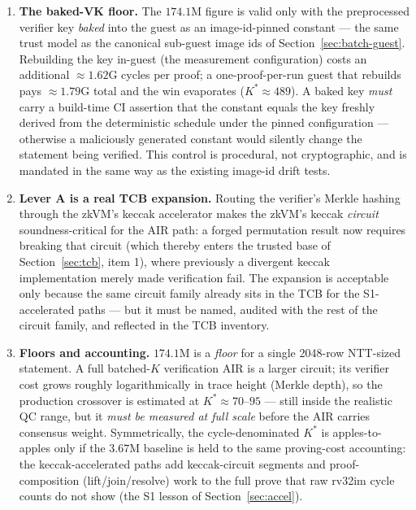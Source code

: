 \documentclass[11pt]{article}
\theoremstyle{plain}
\theoremstyle{definition}
\theoremstyle{remark}
\begin{document}
\begin{enumerate}[leftmargin=1.6em]
\item \textbf{The baked-VK floor.} The $174.1$M figure is valid only with
  the preprocessed verifier key \emph{baked} into the guest as an
  image-id-pinned constant --- the same trust model as the canonical
  sub-guest image ids of Section~\ref{sec:batch-guest}. Rebuilding the key
  in-guest (the measurement configuration) costs an additional
  $\approx 1.62$G cycles per proof; a one-proof-per-run guest that rebuilds
  pays $\approx 1.79$G total and the win evaporates
  ($K^\ast \approx 489$). A baked key \emph{must} carry a build-time CI
  assertion that the constant equals the key freshly derived from the
  deterministic schedule under the pinned configuration --- otherwise a
  maliciously generated constant would silently change the statement being
  verified. This control is procedural, not cryptographic, and is mandated
  in the same way as the existing image-id drift tests.
\item \textbf{Lever A is a real TCB expansion.} Routing the verifier's
  Merkle hashing through the zkVM's keccak accelerator makes the zkVM's
  keccak \emph{circuit} soundness-critical for the AIR path: a forged
  permutation result now requires breaking that circuit (which thereby
  enters the trusted base of Section~\ref{sec:tcb}, item 1), where
  previously a divergent keccak implementation merely made verification
  fail. The expansion is acceptable only because the same circuit family
  already sits in the TCB for the S1-accelerated paths --- but it must be
  named, audited with the rest of the circuit family, and reflected in the
  TCB inventory.
\item \textbf{Floors and accounting.} $174.1$M is a \emph{floor} for a
  single 2048-row NTT-sized statement. A full batched-$K$ verification AIR
  is a larger circuit; its verifier cost grows roughly logarithmically in
  trace height (Merkle depth), so the production crossover is estimated at
  $K^\ast \approx 70$--$95$ --- still inside the realistic QC range, but it
  \emph{must be measured at full scale} before the AIR carries consensus
  weight. Symmetrically, the cycle-denominated $K^\ast$ is apples-to-apples
  only if the $3.67$M baseline is held to the same proving-cost accounting:
  the keccak-accelerated paths add keccak-circuit segments and proof-%
  composition (lift/join/resolve) work to the full prove that raw rv32im
  cycle counts do not show (the S1 lesson of Section~\ref{sec:accel}).
\end{enumerate}
\end{document}
